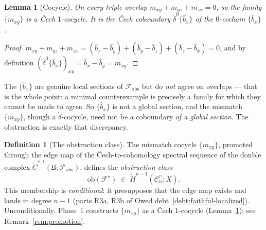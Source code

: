 \documentclass[11pt,oneside]{amsart}
\theoremstyle{plain}
\newtheorem{lemma}[theorem]{Lemma}
\theoremstyle{definition}
\newtheorem{definition}[theorem]{Definition}
\theoremstyle{remark}
\theoremstyle{honeststyle}
\newcommand{\F}{\mathcal{F}}
\newcommand{\Fstar}{\F^{\star}}
\newcommand{\Cn}{\mathcal{C}^{\cap}_n}
\newcommand{\ob}{\mathrm{ob}}
\newcommand{\fobs}{\mathcal{F}_{\mathrm{obs}}}
\begin{document}
\begin{lemma}[Cocycle]
\label{lem:cocycle}
On every triple overlap $m_{xy}+m_{yz}+m_{zx}=0$, so the family
$\{m_{xy}\}$ is a \v{C}ech $1$-cocycle. It is the \v{C}ech coboundary
$\check\delta^{0}\{\widehat b_x\}$ of the $0$-cochain
$\{\widehat b_x\}$.
\end{lemma}

\begin{proof}
$m_{xy}+m_{yz}+m_{zx}=(\widehat b_x-\widehat b_y)+(\widehat
b_y-\widehat b_z)+(\widehat b_z-\widehat b_x)=0$, and by definition
$(\check\delta^{0}\{\widehat b_x\})_{xy}=\widehat b_x-\widehat
b_y=m_{xy}$.
\end{proof}

The $\{\widehat b_x\}$ are genuine local sections of $\fobs$ but do
\emph{not} agree on overlaps --- that is the whole point: a minimal
counterexample is precisely a family for which they cannot be made to
agree. So $\{\widehat b_x\}$ is not a global section, and the mismatch
$\{m_{xy}\}$, though a $\check\delta$-cocycle, need not be a coboundary
\emph{of a global section}. The obstruction is exactly that
discrepancy.

\begin{definition}[The obstruction class]
\label{def:ob}
The mismatch cocycle $\{m_{xy}\}$, promoted through the edge map of the
\v{C}ech-to-cohomology spectral sequence of the double complex
$\check C^{*,*}(\mathfrak U;\fobs)$, defines the \emph{obstruction
class}
\[
  \ob(\Fstar)\;\in\;\widetilde H^{n-1}(\Cn;X).
\]
This membership is \emph{conditional}: it presupposes that the edge map
exists and lands in degree $n-1$ (parts R3a, R3b of Owed
debt~\ref{debt:faithful-localized}). Unconditionally, Phase~1
constructs $\{m_{xy}\}$ as a \v{C}ech $1$-cocycle
(Lemma~\ref{lem:cocycle}); see Remark~\ref{rem:promotion}.
\end{definition}
\end{document}
